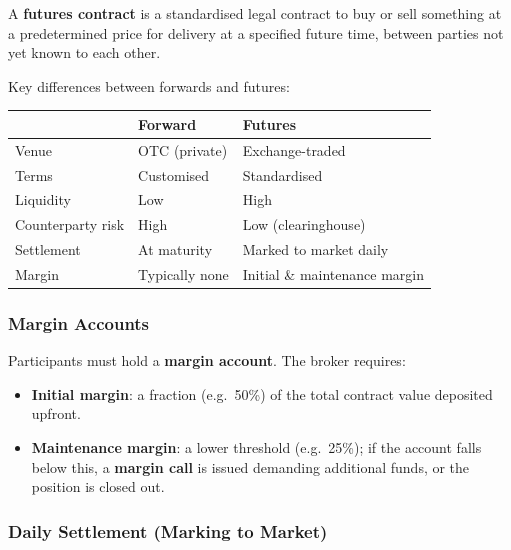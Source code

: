 \begin{definition}
  A \textbf{futures contract} is a standardised legal contract to buy or sell something at a predetermined price for delivery at a specified future time, between parties not yet known to each other.
\end{definition}

\begin{remark}
  Key differences between forwards and futures:
  \begin{center}
  \begin{tabular}{lll}
    \hline
    & \textbf{Forward} & \textbf{Futures} \\
    \hline
    Venue & OTC (private) & Exchange-traded \\
    Terms & Customised & Standardised \\
    Liquidity & Low & High \\
    Counterparty risk & High & Low (clearinghouse) \\
    Settlement & At maturity & Marked to market daily \\
    Margin & Typically none & Initial \& maintenance margin \\
    \hline
  \end{tabular}
  \end{center}
\end{remark}

\subsubsection{Margin Accounts}

\begin{definition}
  Participants must hold a \textbf{margin account}. The broker requires:
  \begin{itemize}
    \item \textbf{Initial margin}: a fraction (e.g.\ 50\%) of the total contract value deposited upfront.
    \item \textbf{Maintenance margin}: a lower threshold (e.g.\ 25\%); if the account falls below this, a \textbf{margin call} is issued demanding additional funds, or the position is closed out.
  \end{itemize}
\end{definition}

\subsubsection{Daily Settlement (Marking to Market)}

